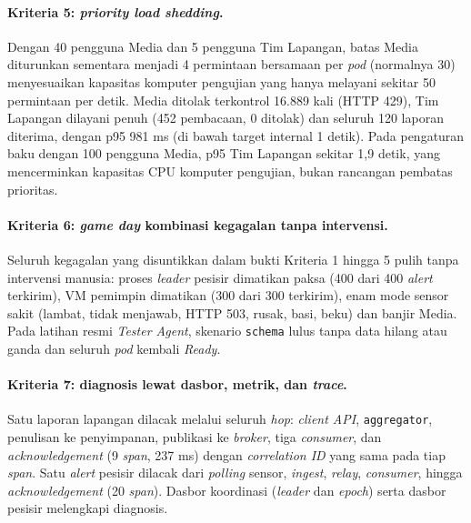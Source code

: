 \paragraph*{Kriteria 5: \textit{priority load shedding}.}
Dengan 40 pengguna Media dan 5 pengguna Tim Lapangan, batas Media diturunkan sementara menjadi 4 permintaan bersamaan per \textit{pod} (normalnya 30) menyesuaikan kapasitas komputer pengujian yang hanya melayani sekitar 50 permintaan per detik. Media ditolak terkontrol 16.889 kali (HTTP 429), Tim Lapangan dilayani penuh (452 pembacaan, 0 ditolak) dan seluruh 120 laporan diterima, dengan p95 981 ms (di bawah target internal 1 detik). Pada pengaturan baku dengan 100 pengguna Media, p95 Tim Lapangan sekitar 1,9 detik, yang mencerminkan kapasitas CPU komputer pengujian, bukan rancangan pembatas prioritas.

\paragraph*{Kriteria 6: \textit{game day} kombinasi kegagalan tanpa intervensi.}
Seluruh kegagalan yang disuntikkan dalam bukti Kriteria 1 hingga 5 pulih tanpa intervensi manusia: proses \textit{leader} pesisir dimatikan paksa (400 dari 400 \textit{alert} terkirim), VM pemimpin dimatikan (300 dari 300 terkirim), enam mode sensor sakit (lambat, tidak menjawab, HTTP 503, rusak, basi, beku) dan banjir Media. Pada latihan resmi \textit{Tester Agent}, skenario \texttt{schema} lulus tanpa data hilang atau ganda dan seluruh \textit{pod} kembali \textit{Ready}.

\paragraph*{Kriteria 7: diagnosis lewat dasbor, metrik, dan \textit{trace}.}
Satu laporan lapangan dilacak melalui seluruh \textit{hop}: \textit{client API}, \texttt{aggregator}, penulisan ke penyimpanan, publikasi ke \textit{broker}, tiga \textit{consumer}, dan \textit{acknowledgement} (9 \textit{span}, 237 ms) dengan \textit{correlation ID} yang sama pada tiap \textit{span}. Satu \textit{alert} pesisir dilacak dari \textit{polling} sensor, \textit{ingest}, \textit{relay}, \textit{consumer}, hingga \textit{acknowledgement} (20 \textit{span}). Dasbor koordinasi (\textit{leader} dan \textit{epoch}) serta dasbor pesisir melengkapi diagnosis.

